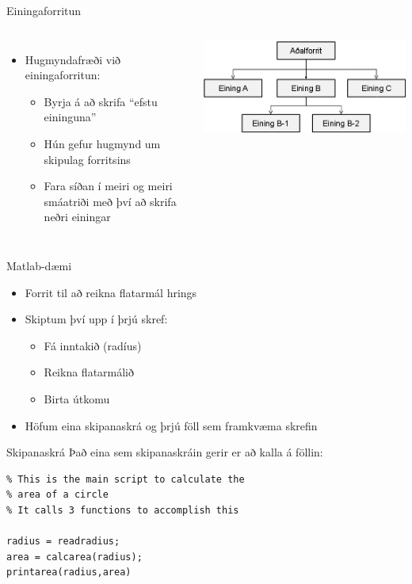 \documentclass[handout]{beamer}
\begin{document}
\begin{frame}{Einingaforritun}
\begin{columns}
\begin{itemize}
 \item Hugmyndafræði við einingaforritun:
 \begin{itemize}
  \item Byrja á að skrifa ``efstu eininguna''
  \item Hún gefur hugmynd um skipulag forritsins
  \item Fara síðan í meiri og meiri smáatriði með því að skrifa neðri einingar
 \end{itemize}
\end{itemize}
\includegraphics[width=\linewidth]{Pics/organization}
\end{columns}
\end{frame}

\begin{frame}{Matlab-dæmi}
\begin{itemize}
 \item Forrit til að reikna flatarmál hrings
 \item Skiptum því upp í þrjú skref:
 \begin{itemize}
  \item Fá inntakið (radíus)
  \item Reikna flatarmálið
  \item Birta útkomu
 \end{itemize}
 \item Höfum eina skipanaskrá og þrjú föll sem framkvæma skrefin
\end{itemize}
\end{frame}

\begin{frame}[fragile]{Skipanaskrá}
Það eina sem skipanaskráin gerir er að kalla á föllin:

\begin{verbatim}
% This is the main script to calculate the
% area of a circle
% It calls 3 functions to accomplish this

radius = readradius;
area = calcarea(radius);
printarea(radius,area)
\end{verbatim}
\end{frame}
\end{document}
